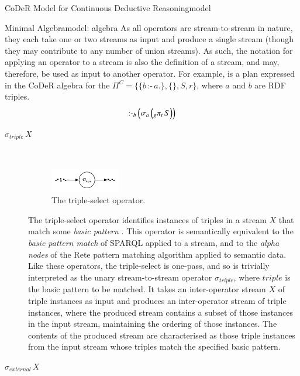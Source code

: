 \begin{nestedsection}{CoDeR Model for Continuous Deductive Reasoning}{model}
\begin{nestedsection}{Minimal Algebra}{model: algebra}
		As all operators are stream-to-stream in nature, they each take one or two streams as input and produce a single stream (though they may contribute to any number of union streams).
		As such, the notation for applying an operator to a stream is also the definition of a stream, and may, therefore, be used as input to another operator.
		For example,  is a plan expressed in the CoDeR algebra for the ${\Pi^C = \{ \{b\,\text{:-}\,a.\}, \{\}, S, r \}}$, where $a$ and $b$ are RDF triples.
		\begin{equation}\labeleqn{basic-example-plan}
			\text{:-}_b \left( \sigma_a \left( {}_g{\pi_t}\,S \right) \right)
		\end{equation}

		\begin{description}
			\item[$\sigma_{triple}\,X$] \hfill \\
				\begin{figure}[t]
					\centering
					\includegraphics[width=0.3\textwidth]{basic-pattern-match}
					\caption{The triple-select operator.}
				\end{figure}
				The triple-select operator identifies instances of triples in a stream $X$ that match some \emph{basic pattern} \citep{w3csparql}.
				This operator is semantically equivalent to the \emph{basic pattern match} of SPARQL applied to a stream, and to the \emph{alpha nodes} of the Rete pattern matching algorithm \citep{forgy79} applied to semantic data.
				Like these operators, the triple-select is one-pass, and so is trivially interpreted as the unary stream-to-stream operator $\sigma_{triple}$, where ${triple}$ is the basic pattern to be matched.
				It takes an inter-operator stream $X$ of triple instances as input and produces an inter-operator stream of triple instances, where the produced stream contains a subset of those instances in the input stream, maintaining the ordering of those instances.
				The contents of the produced stream are characterised as those triple instances from the input stream whose triples match the specified basic pattern.
			\item[$\sigma_{external}\,X$] \hfill \\
				\begin{figure}[b]

\end{figure}
\end{description}
\end{nestedsection}
\end{nestedsection}
